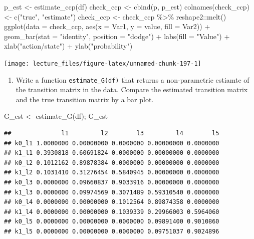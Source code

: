 \documentclass[
]{book}
\newenvironment{Shaded}{\begin{snugshade}}{\end{snugshade}}
\newcommand{\AttributeTok}[1]{\textcolor[rgb]{0.77,0.63,0.00}{#1}}
\newcommand{\FunctionTok}[1]{\textcolor[rgb]{0.00,0.00,0.00}{#1}}
\newcommand{\NormalTok}[1]{#1}
\newcommand{\OtherTok}[1]{\textcolor[rgb]{0.56,0.35,0.01}{#1}}
\newcommand{\SpecialCharTok}[1]{\textcolor[rgb]{0.00,0.00,0.00}{#1}}
\newcommand{\StringTok}[1]{\textcolor[rgb]{0.31,0.60,0.02}{#1}}
\providecommand{\tightlist}{%
  \setlength{\itemsep}{0pt}\setlength{\parskip}{0pt}}
\begin{document}
\begin{Shaded}
\begin{Highlighting}[]
\NormalTok{p\_est }\OtherTok{\textless{}{-}} \FunctionTok{estimate\_ccp}\NormalTok{(df)}
\NormalTok{check\_ccp }\OtherTok{\textless{}{-}} \FunctionTok{cbind}\NormalTok{(p, p\_est)}
\FunctionTok{colnames}\NormalTok{(check\_ccp) }\OtherTok{\textless{}{-}} \FunctionTok{c}\NormalTok{(}\StringTok{"true"}\NormalTok{, }\StringTok{"estimate"}\NormalTok{)}
\NormalTok{check\_ccp }\OtherTok{\textless{}{-}}\NormalTok{ check\_ccp }\SpecialCharTok{\%\textgreater{}\%}
\NormalTok{  reshape2}\SpecialCharTok{::}\FunctionTok{melt}\NormalTok{()}
\FunctionTok{ggplot}\NormalTok{(}\AttributeTok{data =}\NormalTok{ check\_ccp, }\FunctionTok{aes}\NormalTok{(}\AttributeTok{x =}\NormalTok{ Var1, }\AttributeTok{y =}\NormalTok{ value, }
                             \AttributeTok{fill =}\NormalTok{ Var2)) }\SpecialCharTok{+}
  \FunctionTok{geom\_bar}\NormalTok{(}\AttributeTok{stat =} \StringTok{"identity"}\NormalTok{, }\AttributeTok{position =} \StringTok{"dodge"}\NormalTok{) }\SpecialCharTok{+}
  \FunctionTok{labs}\NormalTok{(}\AttributeTok{fill =} \StringTok{"Value"}\NormalTok{) }\SpecialCharTok{+} \FunctionTok{xlab}\NormalTok{(}\StringTok{"action/state"}\NormalTok{) }\SpecialCharTok{+} \FunctionTok{ylab}\NormalTok{(}\StringTok{"probability"}\NormalTok{)}
\end{Highlighting}
\end{Shaded}

\begin{center}\texttt{[image: lecture\_files/figure-latex/unnamed-chunk-197-1]} \end{center}

\begin{enumerate}
\def\labelenumi{\arabic{enumi}.}
\setcounter{enumi}{8}
\tightlist
\item
  Write a function \texttt{estimate\_G(df)} that returns a non-parametric estiamte of the transition matrix in the data. Compare the estimated transition matrix and the true transition matrix by a bar plot.
\end{enumerate}

\begin{Shaded}
\begin{Highlighting}[]
\NormalTok{G\_est }\OtherTok{\textless{}{-}} \FunctionTok{estimate\_G}\NormalTok{(df); G\_est}
\end{Highlighting}
\end{Shaded}

\begin{verbatim}
##              l1         l2        l3         l4        l5
## k0_l1 1.0000000 0.00000000 0.0000000 0.00000000 0.0000000
## k1_l1 0.3930818 0.60691824 0.0000000 0.00000000 0.0000000
## k0_l2 0.1012162 0.89878384 0.0000000 0.00000000 0.0000000
## k1_l2 0.1031410 0.31276454 0.5840945 0.00000000 0.0000000
## k0_l3 0.0000000 0.09660837 0.9033916 0.00000000 0.0000000
## k1_l3 0.0000000 0.09974569 0.3071489 0.59310540 0.0000000
## k0_l4 0.0000000 0.00000000 0.1012564 0.89874358 0.0000000
## k1_l4 0.0000000 0.00000000 0.1039339 0.29966003 0.5964060
## k0_l5 0.0000000 0.00000000 0.0000000 0.09891400 0.9010860
## k1_l5 0.0000000 0.00000000 0.0000000 0.09751037 0.9024896
\end{verbatim}
\end{document}
